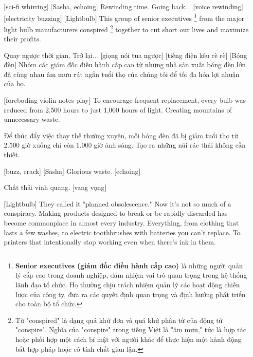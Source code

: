 \documentclass[a4paper]{article}
\begin{document}
	[sci-fi whirring]
	[Sasha, echoing] Rewinding time.
	Going back...
	[voice rewinding]
	[electricity buzzing]
	[Lightbulb] This group of senior executives \footnote{
		\textbf{Senior executives (giám đốc điều hành cấp cao)} là những người quản lý cấp cao trong doanh nghiệp, đảm nhiệm vai trò quan trọng trong hệ thống lãnh đạo tổ chức. Họ thường chịu trách nhiệm quản lý các hoạt động chiến lược của công ty, đưa ra các quyết định quan trọng và định hướng phát triển cho toàn bộ tổ chức.
	
	} from the major light bulb manufacturers conspired \footnote{
		Từ "conspired" là dạng quá khứ đơn và quá khứ phân từ của động từ "conspire". Nghĩa của "conspire" trong tiếng Việt là "âm mưu," tức là hợp tác hoặc phối hợp một cách bí mật với người khác để thực hiện một hành động bất hợp pháp hoặc có tính chất gian lận.
	
	
	} together to cut short our lives and maximize their profits.
	
	\begin{vietnamese-v2}
		 Quay ngược thời gian. 
		Trở lại... [giọng nói tua ngược] 
		[tiếng điện kêu rè rè] [Bóng đèn] Nhóm các giám đốc điều hành cấp cao từ những nhà sản xuất bóng đèn lớn đã cùng nhau âm mưu rút ngắn tuổi thọ của chúng tôi để tối đa hóa lợi nhuận của họ.
	\end{vietnamese-v2}
	
	[foreboding violin notes play]
	To encourage frequent replacement, every bulb was reduced from 2,500 hours to just 1,000 hours of light.
	Creating mountains of unnecessary waste.
	
	\begin{vietnamese-v2}
		 Để thúc đẩy việc thay thế thường xuyên, mỗi bóng đèn đã bị giảm tuổi thọ từ 2.500 giờ xuống chỉ còn 1.000 giờ ánh sáng. Tạo ra những núi rác thải không cần thiết.
	\end{vietnamese-v2}
	
	[buzz, crack]
	[Sasha] Glorious waste. [echoing]
	
	\begin{vietnamese-v2}
		 Chất thải vinh quang. [vang vọng]
	\end{vietnamese-v2}
	
	[Lightbulb] They called it "planned obsolescence."
	Now it's not so much of a conspiracy.
	Making products designed to break or be rapidly discarded has become commonplace in almost every industry.
	Everything, from clothing that lasts a few washes, to electric toothbrushes with batteries you can't replace.
	To printers that intentionally stop working even when there's ink in them.
	
\end{document}
